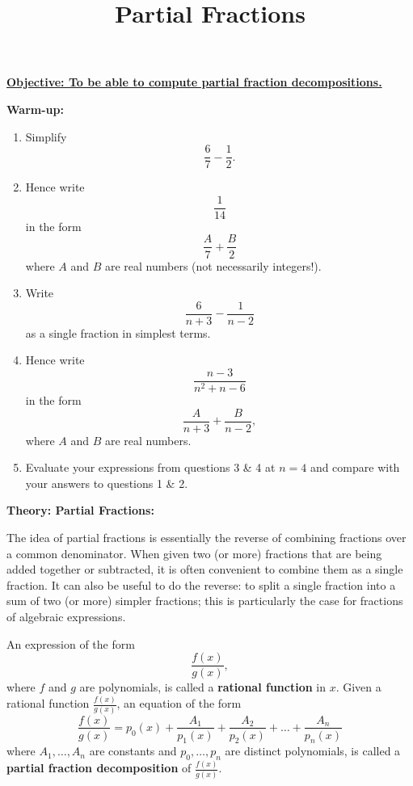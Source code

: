 \documentclass{article}
\begin{document}
\title{Partial Fractions}
\date{}

\maketitle
\thispagestyle{empty}

\Large

\vskip -10mm

\textbf{\underline{Objective: To be able to compute partial fraction decompositions.}}







\vspace{5mm}



\textbf{Warm-up:}\bigskip


\begin{enumerate}
	\item Simplify
		\[\frac{6}{7}-\frac{1}{2}.\] %
	\item Hence write
		\[\frac{1}{14}\]
		in the form
		\[\frac{A}{7}+\frac{B}{2}\]
		where $A$ and $B$ are real numbers (not necessarily integers!).
	\item Write
		\[\frac{6}{n+3}-\frac{1}{n-2}\]
		as a single fraction in simplest terms. %
	\item Hence write
		\[\frac{n-3}{n^2+n-6}\]
		in the form
		\[\frac{A}{n+3}+\frac{B}{n-2},\]
		where $A$ and $B$ are real numbers. %
	\item Evaluate your expressions from questions 3 \& 4 at $n=4$ and compare with your answers to questions 1 \& 2.
\end{enumerate}


\clearpage

\textbf{Theory: Partial Fractions:}\bigskip



The idea of partial fractions is essentially the reverse of combining fractions over a common denominator. When given two (or more) fractions that are being added together or subtracted, it is often convenient to combine them as a single fraction. It can also be useful to do the reverse: to split a single fraction into a sum of two (or more) simpler fractions; this is particularly the case for fractions of algebraic expressions.

An expression of the form
\[\frac{f(x)}{g(x)},\]
where $f$ and $g$ are polynomials, is called a \textbf{rational function} in $x$. Given a rational function $\frac{f(x)}{g(x)}$, an equation of the form
\[\frac{f(x)}{g(x)}=p_0(x)+\frac{A_1}{p_1(x)}+\frac{A_2}{p_2(x)}+\hdots+\frac{A_n}{p_n(x)}\]
where $A_1,\hdots,A_n$ are constants and $p_0,\hdots,p_n$ are distinct polynomials, is called a \textbf{partial fraction decomposition} of $\frac{f(x)}{g(x)}$.\medskip
\end{document}
